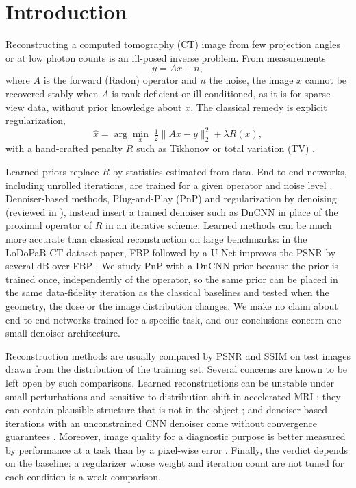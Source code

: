 \section{Introduction}
\label{sec:intro}

Reconstructing a computed tomography (CT) image from few projection angles or at low photon counts is an
ill-posed inverse problem. From measurements
\begin{equation}
y = Ax + n,
\end{equation}
where $A$ is the forward (Radon) operator and $n$ the noise, the image $x$ cannot be recovered stably when
$A$ is rank-deficient or ill-conditioned, as it is for sparse-view data, without prior knowledge about $x$.
The classical remedy is explicit regularization,
\begin{equation}
\hat{x} = \arg\min_x \; \tfrac{1}{2}\lVert Ax - y \rVert_2^2 + \lambda R(x),
\end{equation}
with a hand-crafted penalty $R$ such as Tikhonov or total variation (TV) \citep{rudin1992tv}.

Learned priors replace $R$ by statistics estimated from data. End-to-end networks, including unrolled
iterations, are trained for a given operator and noise level \citep{jin2017,adler2018}. Denoiser-based methods,
Plug-and-Play (PnP) \citep{venkatakrishnan2013plugandplay} and regularization by denoising \citep{romano2017}
(reviewed in \citep{kamilov2023}), instead insert a trained denoiser such as DnCNN \citep{zhang2017dncnn}
in place of the proximal operator of $R$ in an iterative scheme. Learned methods can be much more accurate than
classical reconstruction on large benchmarks: in the LoDoPaB-CT dataset paper, FBP followed by a U-Net improves the PSNR by several dB over FBP \citep{leuschner2021}. We study PnP with a DnCNN prior because
the prior is trained once, independently of the operator, so the same prior can be placed in the same
data-fidelity iteration as the classical baselines and tested when the geometry, the dose or the image
distribution changes. We make no claim about end-to-end networks trained for a specific task, and our
conclusions concern one small denoiser architecture.

Reconstruction methods are usually compared by PSNR and SSIM on test images drawn from the distribution of the
training set. Several concerns are known to be left open by such comparisons. Learned reconstructions can be
unstable under small perturbations \citep{antun2020instabilities} and sensitive to distribution shift
in accelerated MRI \citep{darestani2021shift}; they can contain plausible structure that is not in the object
\citep{bhadra2021}; and denoiser-based iterations with an unconstrained CNN denoiser come without convergence
guarantees \citep{ryu2019pnp,chan2016pnp}. Moreover, image quality for a diagnostic purpose is better measured
by performance at a task than by a pixel-wise error \citep{barrett1993,barrett2004}. Finally, the verdict depends
on the baseline: a regularizer whose weight and iteration count are not tuned for each condition is a weak
comparison.


